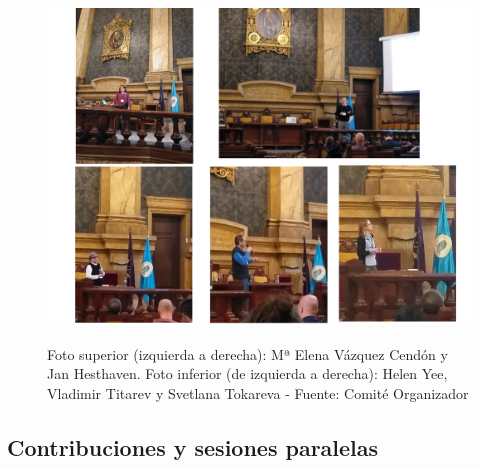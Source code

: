 \documentclass[twoside]{article}
\begin{document}
%
\begin{center}
\begin{figure}
	\centering
		\includegraphics[width=1.2\textwidth]{FotosInv2}
	\label{fig:Invitados2}
	\caption{Foto superior (izquierda a derecha): Mª Elena Vázquez Cendón y Jan Hesthaven. Foto inferior (de izquierda a derecha): Helen Yee, Vladimir Titarev y Svetlana Tokareva  - Fuente: Comité Organizador}
\end{figure}
\end{center}

\subsection{Contribuciones y sesiones paralelas}

%
\end{document}
